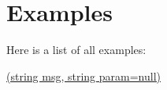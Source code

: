 \section{Examples}
Here is a list of all examples\+:\begin{DoxyCompactItemize}
\item 
\hyperlink{_switch_to_scene-example}{(string msg, string param=null)}
\end{DoxyCompactItemize}
